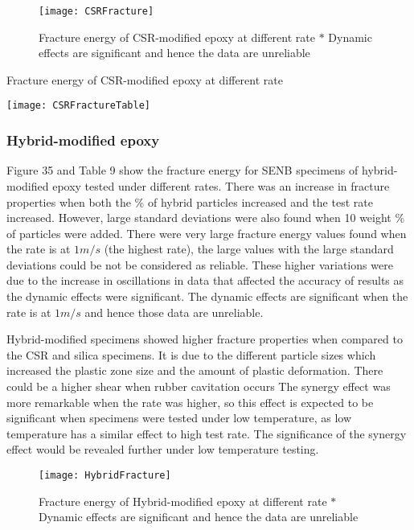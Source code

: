 \documentclass[numbers=noendperiod,chapterprefix=on]{icldt} %
\begin{document}
\begin{figure}[!htpb]
\centering
\texttt{[image: CSRFracture]}
\caption{Fracture energy of CSR-modified epoxy at different rate \newline $\ast$ Dynamic effects are significant and hence the data are unreliable} %
\end{figure}

\begin{table}[!htpb]
\centering
\caption{Fracture energy of CSR-modified epoxy at different rate} %
\texttt{[image: CSRFractureTable]}
\end{table}

\subsubsection{Hybrid-modified epoxy}
Figure 35 and Table 9 show the fracture energy for SENB specimens of hybrid-modified epoxy tested under different rates. There was an increase in fracture properties when both the \% of hybrid particles increased and the test rate increased. However, large standard deviations were also found when 10 weight \% of particles were added. There were very large fracture energy values found when the rate is at $1 m/s$ (the highest rate), the large values with the large standard deviations could be not be considered as reliable. These higher variations were due to the increase in oscillations in data that affected the accuracy of results as the dynamic effects were significant. The dynamic effects are significant when the rate is at $1 m/s$ and hence those data are unreliable.

Hybrid-modified specimens showed higher fracture properties when compared to the CSR and silica specimens. It is due to the different particle sizes which increased the plastic zone size and the amount of plastic deformation. There could be a higher shear when rubber cavitation occurs 
The synergy effect was more remarkable when the rate was higher, so this effect is expected to be significant when specimens were tested under low temperature, as low temperature has a similar effect to high test rate. The significance of the synergy effect would be revealed further under low temperature testing.

\begin{figure}[!htpb]
\centering
\texttt{[image: HybridFracture]}
\caption{Fracture energy of Hybrid-modified epoxy at different rate \newline $\ast$ Dynamic effects are significant and hence the data are unreliable} %
\end{figure}
\end{document}
